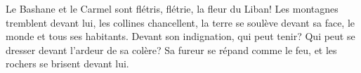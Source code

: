 Le Bashane et le Carmel sont flétris, flétrie, la fleur du Liban!
Les montagnes tremblent devant lui, les collines chancellent,
	la terre se soulève devant sa face, le monde et tous ses habitants.
Devant son indignation, qui peut tenir?
Qui peut se dresser devant l’ardeur de sa colère?
Sa fureur se répand comme le feu, et les rochers se brisent devant lui.
